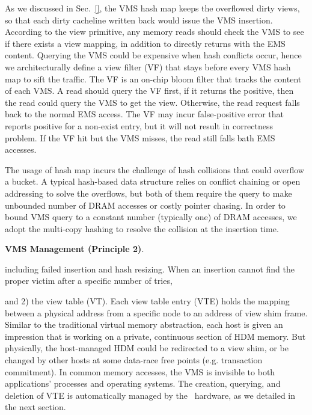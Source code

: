 As we discussed in Sec.~\ref{}, the VMS hash map keeps the overflowed dirty views, so that each dirty cacheline written back would issue the VMS insertion. 
According to the view primitive, any memory reads should check the VMS to see if there exists a view mapping, in addition to directly returns with the EMS content. 
Querying the VMS could be expensive when hash conflicts occur, hence we architecturally define a view filter (VF) that stays before every VMS hash map to sift the traffic. The VF is an on-chip bloom filter that tracks the content of each VMS.
A read should query the VF first, if it returns the positive, then the read could query the VMS to get the view. Otherwise, the read request falls back to the normal EMS access. The VF may incur false-positive error that reports positive for a non-exist entry, but it will not result in correctness problem. If the VF hit but the VMS misses, the read still falls bath EMS accesses. 

The usage of hash map incurs the challenge of hash collisions that could overflow a bucket. A typical hash-based data structure relies on conflict chaining or open addressing to solve the overflows, but both of them require the query to make unbounded number of DRAM accesses or costly pointer chasing. In order to bound VMS query to a constant number (typically one) of DRAM accesses, we adopt the multi-copy hashing to resolve the collision at the insertion time. 

\noindent \textbf{VMS Management (Principle 2)}. 

including failed insertion and hash resizing. When an insertion cannot find the proper victim after a specific number of tries, 



and 2) the view table (VT). Each view table entry (VTE) holds the mapping between a physical address from a specific node to an address of view shim frame. 
Similar to the traditional virtual memory abstraction, each host is given an impression that is working on a private, continuous section of HDM memory. But physically, the host-managed HDM could be redirected to a view shim, or be changed by other hosts at some data-race free points (e.g. transaction commitment). 
In common memory accesses, the VMS is invisible to both applications' processes and operating systems. The creation, querying, and deletion of VTE is automatically managed by the \name~hardware, as we detailed in the next section. 


